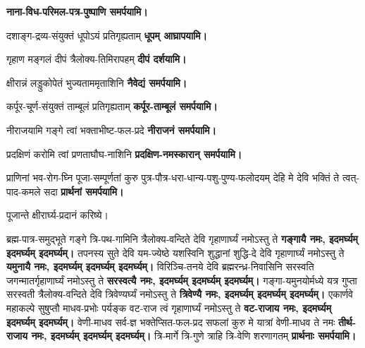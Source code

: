 \begingroup
\centering
\setlength{\columnseprule}{1pt}
\let\chapt\sect



\endgroup

\begin{center}
\textbf{\devAya{} नाना-विध-परिमल-पत्र-पुष्पाणि समर्पयामि।}

{दशाङ्ग-द्रव्य-संयुक्तं धूपोऽयं प्रतिगृह्यताम्}
\textbf{\devAya{} धूपम् आघ्रापयामि।}

{गृहाण मङ्गलं दीपं त्रैलोक्य-तिमिरापहम्}
\textbf{\devAya{} दीपं दर्शयामि।}

{क्षीरान्नं लड्डुकोपेतं भुज्यताममृताशिनि}
\textbf{\devAya{} नैवेद्यं समर्पयामि।}

{कर्पूर-चूर्ण-संयुक्तं ताम्बूलं प्रतिगृह्यताम्}
\textbf{\devAya{} कर्पूर-ताम्बूलं समर्पयामि।}

{नीराजयामि गङ्गे त्वां भक्ताभीष्ट-फल-प्रदे}
\textbf{\devAya{} नीराजनं समर्पयामि।}

{प्रदक्षिणं करोमि त्वां प्रणताघौघ-नाशिनि}
\textbf{\devAya{} प्रदक्षिण-नमस्कारान् समर्पयामि।}

{प्राणिनां भव-रोग-घ्नि पूजा-सम्पूर्णतां कुरु}
{पुत्र-पौत्र-धरा-धान्य-पशु-पुण्य-फलोदयम्}
{देहि मे देवि भक्तिं ते त्वत्-पाद-कमले सदा}
\textbf{\devAya{} प्रार्थनां समर्पयामि।}

पूजान्ते क्षीरार्घ्य-प्रदानं करिष्ये।

\resetShloka

\twolineshloka
{ब्रह्म-पात्र-समुद्भूते गङ्गे त्रि-पथ-गामिनि}
{त्रैलोक्य-वन्दिते देवि गृहाणार्घ्यं नमोऽस्तु ते}
\textbf{गङ्गायै नमः, इदमर्घ्यम् इदमर्घ्यम् इदमर्घ्यम्।}
\twolineshloka
{तपनस्य सुते देवि यम-ज्येष्ठे यशस्विनि}
{शुद्धानां शुद्धि-दे देवि गृहाणार्घ्यं नमोऽस्तु ते}
\textbf{यमुनायै नमः, इदमर्घ्यम् इदमर्घ्यम् इदमर्घ्यम्।}
\twolineshloka
{विरिञ्चि-तनये देवि ब्रह्मरन्ध्र-निवासिनि}
{सरस्वति जगन्मातर्गृहाणार्घ्यं नमोऽस्तु ते}
\textbf{सरस्वत्यै नमः, इदमर्घ्यम् इदमर्घ्यम् इदमर्घ्यम्।}
\twolineshloka
{गङ्गा-यमुनयोर्मध्ये यत्र गुप्ता सरस्वती}
{त्रैलोक्य-वन्दिते देवि त्रिवेण्यर्घ्यं नमोऽस्तु ते}
\textbf{त्रिवेण्यै नमः, इदमर्घ्यम् इदमर्घ्यम् इदमर्घ्यम्।}
\twolineshloka
{एकार्णवे महाकल्पे सुषुप्तौ माधव-प्रभोः}
{पर्यङ्क वट-राज त्वं गृहाणार्घ्यं नमोऽस्तु ते}
\textbf{वट-राजाय नमः, इदमर्घ्यम् इदमर्घ्यम् इदमर्घ्यम्।}
\twolineshloka
{वेणी-माधव सर्व-ज्ञ भक्तेप्सित-फल-प्रद}
{सफलां कुरु मे यात्रां वेणी-माधव ते नमः}
\textbf{तीर्थ-राजाय नमः, इदमर्घ्यम् इदमर्घ्यम् इदमर्घ्यम्।}
{त्रि-मार्गे त्रि-गुणे त्राहि त्रि-वेणि शरणागतम्}
\textbf{प्रार्थनाः समर्पयामि।}

\end{center}

